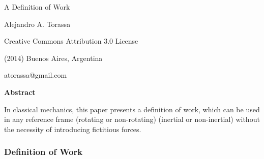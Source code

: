 \documentclass[10pt]{article}
\begin{document}
\begin{center}

{\LARGE A Definition of Work}

\bigskip \medskip

Alejandro A. Torassa

\bigskip \medskip

\footnotesize

Creative Commons Attribution 3.0 License

(2014) Buenos Aires, Argentina

atorassa@gmail.com

\bigskip \smallskip

\small

{\bf Abstract}

\bigskip

\parbox{87mm}{In classical mechanics, this paper presents a definition of work, which can be used in any reference frame (rotating or non-rotating) (inertial or non-inertial) without the necessity of introducing fictitious forces.}

\end{center}

\normalsize

\vspace{-0.60em}

{\centering\subsubsection*{Definition of Work}}

\vspace{+0.60em}
\end{document}
